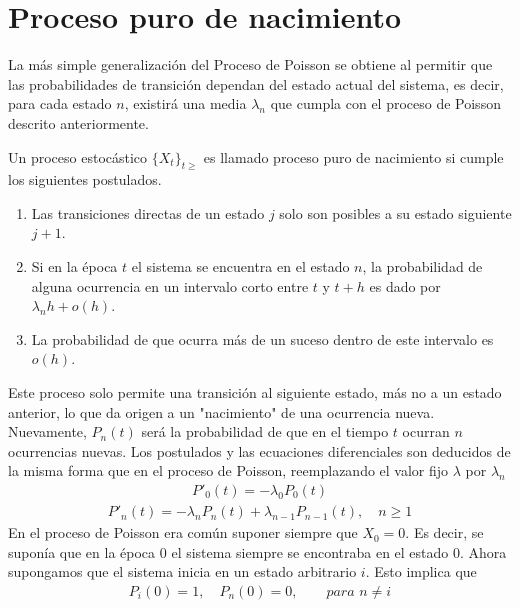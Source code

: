 \section{Proceso puro de nacimiento}
\label{proc_nac}
La más simple generalización del Proceso de Poisson se obtiene al permitir que las probabilidades de transición dependan del estado actual del sistema, es decir, para cada estado $n$, existirá una media $\lambda_n$ que cumpla con el proceso de Poisson descrito anteriormente.
\begin{Def}
Un proceso estocástico $\{X_t\}_{t\geq}$ es llamado proceso puro de nacimiento si cumple los siguientes postulados.
    \begin{enumerate}
        \item Las transiciones directas de un estado $j$ solo son posibles a su estado siguiente $j+1$.
        \item Si en la época $t$ el sistema se encuentra en el estado $n$, la probabilidad de alguna ocurrencia en un intervalo corto entre $t$ y $t+h$ es dado por $\lambda_n h+o(h)$. 
        \item La probabilidad de que ocurra más de un suceso dentro de este intervalo es $o(h)$.
    \end{enumerate}
\end{Def}
Este proceso solo permite una transición al siguiente estado, más no a un estado anterior, lo que da origen a un "nacimiento" de una ocurrencia nueva.\\Nuevamente, $P_n(t)$ será la probabilidad de que en el tiempo $t$ ocurran $n$ ocurrencias nuevas.
Los postulados y las ecuaciones diferenciales son deducidos de la misma forma que en el proceso de Poisson, reemplazando el valor fijo $\lambda$ por $\lambda_n$
\begin{eqnarray}
    P'_0(t)=-\lambda_0 P_0(t)
    \label{procNacimiento-edo-0}
\end{eqnarray}
\begin{eqnarray}
    P'_n(t)=-\lambda_n P_n(t)+\lambda_{n-1} P_{n-1}(t),\quad n\geq 1
    \label{procNacimiento-edo-n}
\end{eqnarray}
En el proceso de Poisson era común suponer siempre que $X_0=0$. Es decir, se suponía que en la época $0$ el sistema siempre se encontraba en el estado $0$.
Ahora supongamos que el sistema inicia en un estado arbitrario $i$. Esto implica que
\begin{eqnarray}
    P_i(0)=1,\quad P_n(0)=0,\quad\quad\textit{para }n\not=i
    \label{procNacimiento-edo-condInicial}
\end{eqnarray}
